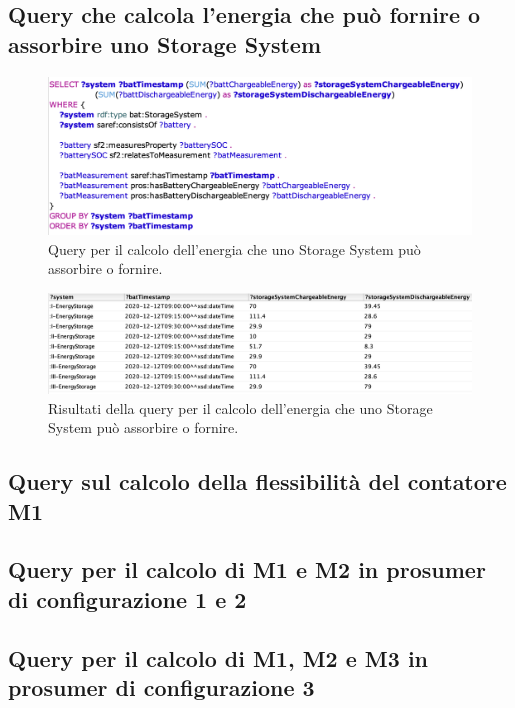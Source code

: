 \subsection{Query che calcola l'energia che può fornire o assorbire uno Storage System}

\begin{figure}[H]
    \centering
    \includegraphics[width=15cm]{images/subquery.png}
    \caption{Query per il calcolo dell'energia che uno Storage System può assorbire o fornire.}
    \label{fig:subquery}
\end{figure}

\begin{figure}[H]
    \centering
    \includegraphics[width=15cm]{images/subquery_res.png}
    \caption{Risultati della query per il calcolo dell'energia che uno Storage System può assorbire o fornire.}
    \label{fig:subquery_res}
\end{figure}

\subsection{Query sul calcolo della flessibilità del contatore M1}

\subsection{Query per il calcolo di M1 e M2 in prosumer di configurazione 1 e 2}

\subsection{Query per il calcolo di M1, M2 e M3 in prosumer di configurazione 3}